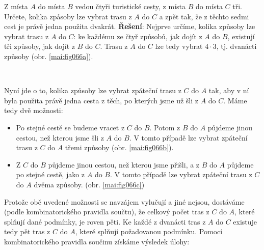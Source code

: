 \begin{mdframed}[style=mdexam]
  \begin{example}\label{mai:exam096}
    Z místa \(A\) do místa \(B\) vedou čtyři turistické cesty, z místa \(B\) do místa \(C\) tři.
    Určete, kolika zpåsoby lze vybrat trasu z \(A\) do \(C\) a zpět tak, že z těchto sedmi cest je
    právě jedna použita dvakrát. \newline
    \textbf{Řešení}: Nejprve určíme, kolika způsoby lze vybrat trasu z \(A\) do \(C\): ke každému ze
    čtyř způsobů, jak dojít z \(A\) do \(B\), existují tři způsoby, jak dojít z \(B\) do \(C\).
    Trasu z \(A\) do \(C\) lze tedy vybrat \(4\cdot3\), tj. dvanácti způsoby (obr.
    \ref{mai:fig066a}).

    {\centering
      \captionsetup{type=figure}
      \captionsetup[subfigure]{justification=centering}
       \\
      \label{mai:fig066}
    \par}
    
    Nyní jde o to, kolika způsoby lze vybrat zpáteční trasu z \(C\) do \(A\) tak, aby v ní byla
    použita právě jedna cesta z těch, po kterých jsme už šli z \(A\) do \(C\). Máme tedy dvě
    možnosti:
    \begin{itemize}[noitemsep]
      \item Po stejné cestě se budeme vracet z \(C\) do \(B\). Potom z \(B\) do \(A\) půjdeme jinou
            cestou, než kterou jsme šli z \(A\) do \(B\). V tomto případě lze vybrat zpáteční trasu
            z \(C\) do \(A\) třemi způsoby (obr. \ref{mai:fig066b}).
      \item Z \(C\) do \(B\) půjdeme jinou cestou, než kterou jsme přišli, a z \(B\) do \(A\)
            půjdeme po stejné cestě, jako z \(A\) do \(B\). V tomto případě lze vybrat zpáteční
            trasu z \(C\) do \(A\) dvěma způsoby. (obr. \ref{mai:fig066c})
    \end{itemize}
    Protože obě uvedené možnosti se navzájem vylučují a jiné nejsou, dostáváme (podle
    kombinatorického pravidla součtu), že celkový počet tras z \(C\) do \(A\), které splňují dané
    podmínky, je roven pěti. Ke každé z dvanácti tras z \(A\) do \(C\) existuje tedy pět tras z
    \(C\) do \(A\), které splňují požadovanou podmínku. Pomocí kombinatorického pravidla součinu
    získáme výsledek úlohy: 
    

\end{example}
\end{mdframed}
